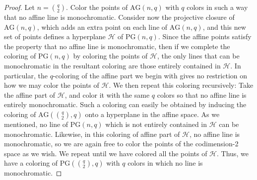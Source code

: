 \documentclass[12pt]{article}
\newcommand{\PG}{\text{PG}}
\newcommand{\AG}{\text{AG}}
\begin{document}
\begin{proof}
    Let $n = \binom{q}{2}$. Color the points of $\AG(n, q)$ with $q$ colors in such a way that no affine line is monochromatic. Consider now the projective closure of $\AG(n, q)$, which adds an extra point on each line of $\AG(n, q)$, and this new set of points defines a hyperplane $\mathcal{H}$ of $\PG(n, q)$. Since the affine points satisfy the property that no affine line is monochromatic, then if we complete the coloring of $\PG(n, q)$ by coloring the points of $\mathcal{H}$, the only lines that can be monochromatic in the resultant coloring are those entirely contained in $\mathcal{H}$. In particular, the $q$-coloring of the affine part we begin with gives no restriction on how we may color the points of $\mathcal{H}$. We then repeat this coloring recursively: Take the affine part of $\mathcal{H}$, and color it with the same $q$ colors so that no affine line is entirely monochromatic. Such a coloring can easily be obtained by inducing the coloring of $\AG(\binom{q}{2}, q)$ onto a hyperplane in the affine space. As we mentioned, no line of $\PG(n, q)$ which is not entirely contained in $\mathcal{H}$ can be monochromatic. Likewise, in this coloring of affine part of $\mathcal{H}$, no affine line is monochromatic, so we are again free to color the points of the codimension-2 space as we wish. We repeat until we have colored all the points of $\mathcal{H}$. Thus, we have a coloring of $\PG(\binom{q}{2}, q)$ with $q$ colors in which no line is monochromatic. 
\end{proof}
\end{document}
